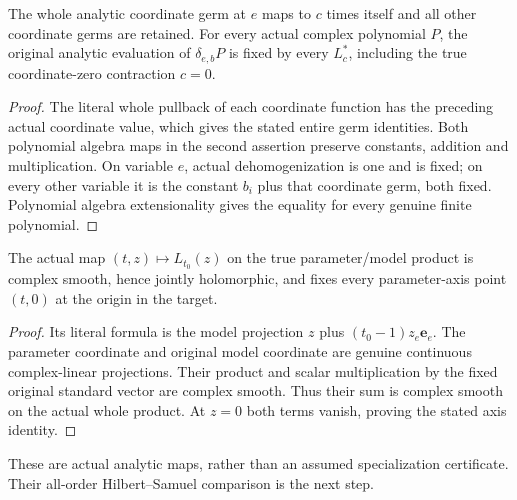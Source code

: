 \begin{theorem}
\label{hir:actual-axis-contraction-fixes-dehomogenized-polynomial}
\leanok
The whole analytic coordinate germ at $e$ maps to $c$ times itself and all
other coordinate germs are retained. For every actual complex polynomial
$P$, the original analytic evaluation of $\delta_{e,b}P$ is fixed by
every $L_c^*$, including the true coordinate-zero contraction $c=0$.
\end{theorem}
\begin{proof}
The literal whole pullback of each coordinate function has the preceding
actual coordinate value, which gives the stated entire germ identities.
Both polynomial algebra maps in the second assertion preserve constants,
addition and multiplication. On variable $e$, actual dehomogenization is
one and is fixed; on every other variable it is the constant $b_i$ plus
that coordinate germ, both fixed. Polynomial algebra extensionality gives
the equality for every genuine finite polynomial.
\end{proof}

\begin{lemma}
\label{hir:actual-axis-contraction-joint-holomorphic}
\leanok
The actual map $(t,z)\mapsto L_{t_0}(z)$ on the true parameter/model product
is complex smooth, hence jointly holomorphic, and fixes every parameter-axis
point $(t,0)$ at the origin in the target.
\end{lemma}
\begin{proof}
Its literal formula is the model projection $z$ plus
$(t_0-1)z_e\mathbf e_e$. The parameter coordinate and original model
coordinate are genuine continuous complex-linear projections. Their
product and scalar multiplication by the fixed original standard vector
are complex smooth. Thus their sum is complex smooth on the actual whole
product. At $z=0$ both terms vanish, proving the stated axis identity.
\end{proof}

These are actual analytic maps, rather than an assumed specialization
certificate. Their all-order Hilbert--Samuel comparison is the next step.
